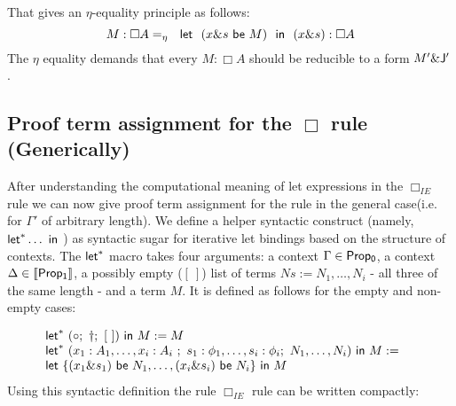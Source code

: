         That gives an $\eta$-equality principle as follows:
        {\small
            $$M:\Box A =_{\eta}\ \ {\sf let} \ \ (x \& s\  {\sf be} \ M)\ \ {\sf in}\ \  { (x \& s)}:\Box A$$
        }
        The $\eta$ equality demands that every $M:\Box A$ should be reducible to a form $M'\& {\sf J^{\prime}}$.  
        \subsection{Proof term assignment for the $\Box$ rule (Generically)}
        After understanding the computational meaning of let expressions in the $\Box_{IE}$ rule 
        we can now give  proof term assignment  for the rule in the general case(i.e. for $\Gamma'$ of arbitrary length). 
        We define a helper syntactic construct (namely, ${\sf let}^{*}\ldots {\ \sf in\ }$) as syntactic sugar for iterative  let bindings based on the structure  of contexts.
        The ${\sf let}^{*}$ macro takes four arguments: a context $\Gamma\in {\sf Prop_0}$, a  context $\Delta\in{\sf \llbracket Prop_1\rrbracket}$,  
        a possibly empty ($[\ ]$) list of terms  $Ns:=N_1,\ldots,  N_i$ - all three of the same length - and a term $M$. It is defined as follows for the empty and non-empty cases:
        
        {\small
            $$\begin{array}{ll}
            \nonumber {\sf let}^{*}\ (\circ;\ \dagger;\  [\ ]) {\ \sf in\ }  M:= M \  &\\
            \nonumber {\sf let}^{*}\ (x_1:A_1,\ldots, x_i:A_i\ ;\  s_1: \phi_1, \ldots, s_i:\phi_i;\  N_1,\ldots,  N_i) {\ \sf in\ } M:= \  & \\
            {\sf let} \ \{(x_1 \& s_1)\  {\sf be}\  N_1,\ldots,  (x_i \& s_i)\  {\sf be}\  N_i\}\ {\sf in}\  M &\\
            \end{array}$$}
        Using this syntactic definition the rule $\Box_{IE}$ rule  can be written compactly:
        
